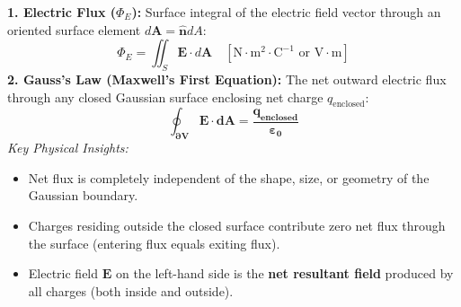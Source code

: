 \documentclass[10pt,twoside,openright]{book}
\begin{document}
\begin{conceptbox}
\textbf{1. Electric Flux ($\Phi_E$):}
Surface integral of the electric field vector through an oriented surface element $d\mathbf{A} = \hat{\mathbf{n}} dA$:
\begin{equation}
  \Phi_E = \iint_S \mathbf{E}\cdot d\mathbf{A} \quad [\mathrm{N}\cdot\mathrm{m}^2\cdot\mathrm{C}^{-1} \text{ or } \mathrm{V}\cdot\mathrm{m}]
\end{equation}
\textbf{2. Gauss's Law (Maxwell's First Equation):}
The net outward electric flux through any closed Gaussian surface enclosing net charge $q_{\text{enclosed}}$:
\begin{equation}
  \mathbf{\oint_{\partial V} \mathbf{E}\cdot d\mathbf{A} = \frac{q_{\text{enclosed}}}{\varepsilon_0}}
\end{equation}
\textit{Key Physical Insights:}
\begin{itemize}
  \item Net flux is completely independent of the shape, size, or geometry of the Gaussian boundary.
  \item Charges residing outside the closed surface contribute zero net flux through the surface (entering flux equals exiting flux).
  \item Electric field $\mathbf{E}$ on the left-hand side is the \textbf{net resultant field} produced by all charges (both inside and outside).
\end{itemize}
\end{conceptbox}
\end{document}
